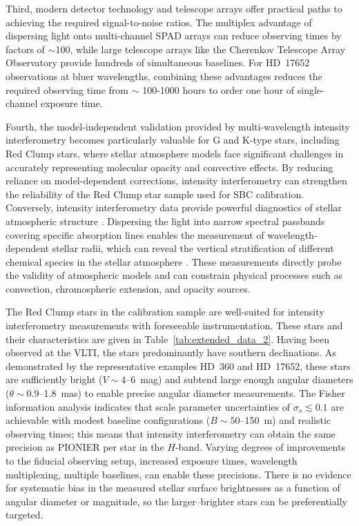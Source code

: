 \documentclass[linenumbers,trackchanges]{aastex701}
\begin{document}
Third, modern detector technology and telescope arrays offer practical paths to achieving the required signal-to-noise ratios. The multiplex advantage of dispersing light onto multi-channel SPAD arrays can reduce observing times by factors of $\sim$100, while large telescope arrays like the Cherenkov Telescope Array Observatory provide hundreds of simultaneous baselines. For HD~17652 observations at bluer wavelengths, combining these advantages reduces the required observing time from $\sim$ 100-1000 hours to order one hour of single-channel exposure time.

Fourth, the model-independent validation provided by multi-wavelength intensity interferometry becomes particularly valuable for G and K-type stars, including Red Clump stars, where stellar atmosphere models face significant challenges in accurately representing molecular opacity and convective effects. By reducing reliance on model-dependent corrections, intensity interferometry can strengthen the reliability of the Red Clump star sample used for SBC calibration.
Conversely, intensity interferometry data provide powerful diagnostics of stellar atmospheric structure \citep{2004A&A...413..711W}. Dispersing the light into narrow spectral passbands covering specific absorption lines enables the measurement of wavelength-dependent stellar radii, which can reveal the vertical stratification of different chemical species in the stellar atmosphere \citep{presentation_Aufdenberg}. These measurements directly probe the validity of atmospheric models and can constrain physical processes such as convection, chromospheric extension, and opacity sources.

The Red Clump stars in the \citet{2019Natur.567..200P} calibration sample are well-suited for intensity interferometry measurements with foreseeable instrumentation. 
These stars and their characteristics
are given in Table~\ref{tab:extended_data_2}.  Having been observed at the VLTI, the stars predominantly have southern declinations.
As demonstrated by the representative examples HD~360 and HD~17652, these stars are sufficiently bright ($V \sim 4$--6~mag) and subtend large enough angular diameters ($\theta \sim 0.9$--1.8~mas) to enable precise angular diameter measurements.
The Fisher information analysis indicates that scale parameter uncertainties of $\sigma_s \lesssim 0.1$
are achievable with modest baseline configurations ($B \sim 50$--150~m) and realistic observing times;
this means that intensity interferometry
can obtain the same precision as PIONIER per star in the $H$-band.  
Varying degrees of improvements to the fiducial observing setup, increased exposure times, wavelength multiplexing, multiple baselines, can enable these precisions.
There is no evidence for systematic bias in the measured stellar surface brightnesses as a function
of angular diameter or magnitude, so the larger--brighter stars can be preferentially targeted.       
\end{document}
